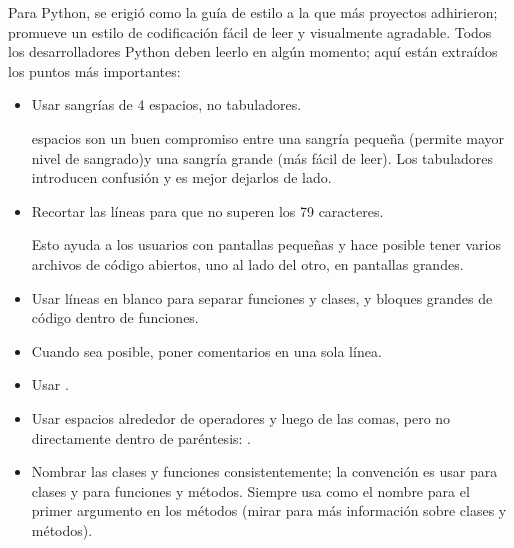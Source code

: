 \documentclass[a5paper,10pt,spanish]{sphinxmanual}
\begin{document}
\sphinxAtStartPar
Para Python,   se erigió como la guía de estilo a la que más proyectos adhirieron; promueve un estilo de codificación fácil de leer y visualmente agradable. Todos los desarrolladores Python deben leerlo en algún momento; aquí están extraídos los puntos más importantes:
\begin{itemize}
\item {} 
\sphinxAtStartPar
Usar sangrías de 4 espacios, no tabuladores.

 espacios son un buen compromiso entre una sangría pequeña (permite mayor nivel de sangrado)y una sangría grande (más fácil de leer). Los tabuladores introducen confusión y es mejor dejarlos de lado.

\item {} 
\sphinxAtStartPar
Recortar las líneas para que no superen los 79 caracteres.

\sphinxAtStartPar
Esto ayuda a los usuarios con pantallas pequeñas y hace posible tener varios archivos de código abiertos, uno al lado del otro, en pantallas grandes.

\item {} 
\sphinxAtStartPar
Usar líneas en blanco para separar funciones y clases, y bloques grandes de código dentro de funciones.

\item {} 
\sphinxAtStartPar
Cuando sea posible, poner comentarios en una sola línea.

\item {} 
\sphinxAtStartPar
Usar .

\item {} 
\sphinxAtStartPar
Usar espacios alrededor de operadores y luego de las comas, pero no directamente dentro de paréntesis: .

\item {} 
\sphinxAtStartPar
Nombrar las clases y funciones consistentemente; la convención es usar  para clases y  para funciones y métodos. Siempre usa  como el nombre para el primer argumento en los métodos (mirar {\hyperref[\detokenize{tutorial/classes:tut-firstclasses}]{}} para más información sobre clases y métodos).


\end{itemize}
\end{document}

